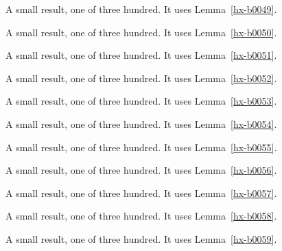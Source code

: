 \begin{lemma}[Bulk 50]\label{hx-b0050}
A small result, one of three hundred. It uses Lemma~\ref{hx-b0049}.
\end{lemma}

\begin{lemma}[Bulk 51]\label{hx-b0051}
A small result, one of three hundred. It uses Lemma~\ref{hx-b0050}.
\end{lemma}

\begin{lemma}[Bulk 52]\label{hx-b0052}
A small result, one of three hundred. It uses Lemma~\ref{hx-b0051}.
\end{lemma}

\begin{lemma}[Bulk 53]\label{hx-b0053}
A small result, one of three hundred. It uses Lemma~\ref{hx-b0052}.
\end{lemma}

\begin{lemma}[Bulk 54]\label{hx-b0054}
A small result, one of three hundred. It uses Lemma~\ref{hx-b0053}.
\end{lemma}

\begin{lemma}[Bulk 55]\label{hx-b0055}
A small result, one of three hundred. It uses Lemma~\ref{hx-b0054}.
\end{lemma}

\begin{lemma}[Bulk 56]\label{hx-b0056}
A small result, one of three hundred. It uses Lemma~\ref{hx-b0055}.
\end{lemma}

\begin{lemma}[Bulk 57]\label{hx-b0057}
A small result, one of three hundred. It uses Lemma~\ref{hx-b0056}.
\end{lemma}

\begin{lemma}[Bulk 58]\label{hx-b0058}
A small result, one of three hundred. It uses Lemma~\ref{hx-b0057}.
\end{lemma}

\begin{lemma}[Bulk 59]\label{hx-b0059}
A small result, one of three hundred. It uses Lemma~\ref{hx-b0058}.
\end{lemma}

\begin{lemma}[Bulk 60]\label{hx-b0060}
A small result, one of three hundred. It uses Lemma~\ref{hx-b0059}.
\end{lemma}

